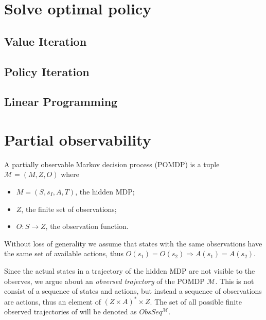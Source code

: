 
\section*{Solve optimal policy}
\subsection*{Value Iteration}

\subsection*{Policy Iteration}

\subsection*{Linear Programming}

\section*{Partial observability}

\begin{definition}[POMDP]
	A partially observable Markov decision process (POMDP) is a tuple $\mathcal{M}=(M, Z, O)$ where 
	\begin{itemize}
		\item $M=(S,s_I,A,T)$, the hidden MDP;
		\item $Z$, the finite set of observations;
		\item $O:S\to Z$, the observation function. %
	\end{itemize}
\end{definition}

Without loss of generality we assume that states with the same observations have the same set of available actions, thus $O(s_1)=O(s_2)\Rightarrow A(s_1)=A(s_2)$.

Since the actual states in a trajectory of the hidden MDP are not visible to the observes, we argue about an \textit{obversed trajectory} of the POMDP $\mathcal{M}$. This is not consist of a sequence of states and actions, but instead a sequence of observations are actions, thus an element of $(Z\times A)^*\times Z$. The set of all possible finite observed trajectories of will be denoted as $ObsSeq^{\mathcal{M}}$.

